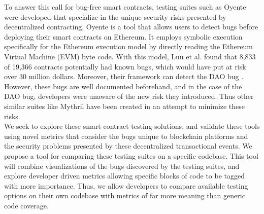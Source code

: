 To answer this call for bug-free smart contracts, testing suites such as Oyente were developed that specialize in the unique security risks presented by decentralized contracting. Oyente is a tool that allows users to detect bugs before deploying their smart contracts on Ethereum. It employs symbolic execution specifically for the Ethereum execution model\cite{wood2014ethereum} by directly reading the Ethereum Virtual Machine (EVM) byte code. With this model, Luu et al. found that 8,833 of 19,366 contracts potentially had known bugs, which would have put at risk over 30 million dollars. Moreover, their framework can detect the DAO bug \cite{luu2016making}. However, these bugs are well documented beforehand, and in the case of the DAO bug, developers were unaware of the new risk they introduced. Thus other similar suites like Mythril have been created in an attempt to minimize these risks.\\


We seek to explore these smart contract testing solutions, and validate these tools using novel metrics that consider the bugs unique to blockchain platforms and the security problems presented by these decentralized transactional events. We propose a tool for comparing these testing suites on a specific codebase. This tool will combine visualizations of the bugs discovered by the testing suites, and explore developer driven metrics allowing specific blocks of code to be tagged with more importance. Thus, we allow developers to compare available testing options on their own codebase with metrics of far more meaning than generic code coverage. \\


